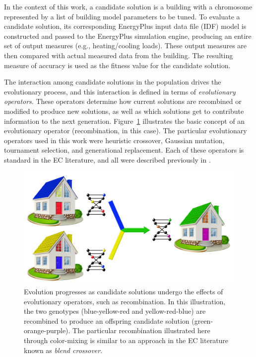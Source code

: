 \documentclass[preprint, review, 12pt]{elsarticle}
\begin{document}
In the context of this work, a candidate solution is a building with a chromosome represented by a list of building model parameters to be tuned. To evaluate a candidate solution, its corresponding EnergyPlus input data file (IDF) model is constructed and passed to the EnergyPlus simulation engine, producing an entire set of output measures (e.g., heating/cooling loads). These output measures are then compared with actual measured data from the building. The resulting measure of accuracy is used as the fitness value for the candidate solution. 

The interaction among candidate solutions in the population drives the evolutionary process, and this interaction is defined in terms of \emph{evolutionary operators}. These operators determine how current solutions are recombined or modified to produce new solutions, as well as which solutions get to contribute information to the next generation. Figure~\ref{fig:crossover} illustrates the basic concept of an evolutionary operator (recombination, in this case). The particular evolutionary operators used in this work were heuristic crossover, Gaussian mutation, tournament selection, and generational replacement. Each of these operators is standard in the EC literature, and all were described previously in \cite{cit:garrett2013}.

\begin{figure}[htbp]
\centering
\includegraphics[width=5in]{graphics/autotune_crossover}
\caption{Evolution progresses as candidate solutions undergo the effects of evolutionary operators, such as recombination. In this illustration, the two genotypes (blue-yellow-red and yellow-red-blue) are recombined to produce an offspring candidate solution (green-orange-purple). The particular recombination illustrated here through color-mixing is similar to an approach in the EC literature known as \emph{blend crossover}.}
\label{fig:crossover}
\end{figure}
\end{document}
